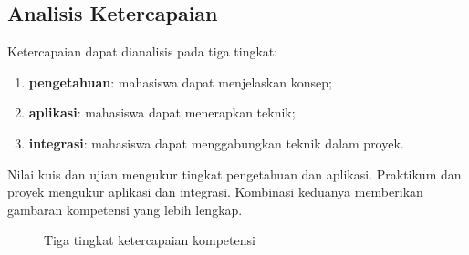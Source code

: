 \subsection{Analisis Ketercapaian}

Ketercapaian dapat dianalisis pada tiga tingkat:
\begin{enumerate}[label=\arabic*.,leftmargin=*]
  \item \textbf{pengetahuan}: mahasiswa dapat menjelaskan konsep;
  \item \textbf{aplikasi}: mahasiswa dapat menerapkan teknik;
  \item \textbf{integrasi}: mahasiswa dapat menggabungkan teknik
        dalam proyek.
\end{enumerate}

Nilai kuis dan ujian mengukur tingkat pengetahuan dan aplikasi.
Praktikum dan proyek mengukur aplikasi dan integrasi. Kombinasi
keduanya memberikan gambaran kompetensi yang lebih lengkap.

\begin{figure}[H]
\centering
{}
\caption{Tiga tingkat ketercapaian kompetensi}
\label{fig:ch17-levels}
\end{figure}
